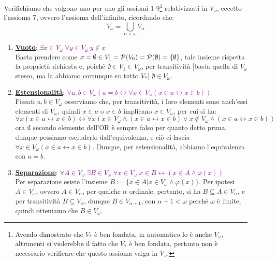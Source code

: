 \begin{soln}
	Verifichiamo che valgono uno per uno gli assiomi 1-9\footnote{Avendo dimostrato che $V_*$ è ben fondata, in automatico lo è anche $V_\omega$, altrimenti si violerebbe il fatto che $V_*$ è ben fondata, pertanto non è necessario verificare che questo assioma valga in $V_\omega$.} relativizzati in $V_\omega$, eccetto l'assioma 7, ovvero l'assioma dell'infinito, ricordando che:
	\[ V_\omega = \bigcup_{\alpha < \omega} V_\alpha
		\]
	\begin{enumerate}[(1)]
		\item \textbf{\underline{Vuoto}}: \textcolor{purple}{$\exists x \in V_\omega \; \forall y \in V_\omega \; y \not \in x$} \\
		Basta prendere come $x = \emptyset \in V_1 = \mathcal{P}(V_0) = \mathcal{P}(\emptyset) = \{\emptyset\}$, tale insieme rispetta la proprietà richiesta e, poiché $\emptyset \in V_1 \in V_\omega$, per transitività [basta quella di $V_\omega$ stesso, ma la abbiamo comunque su tutto $V_*$] $\emptyset \in V_\omega$.
		\item \textbf{\underline{Estensionalità}}: \textcolor{purple}{$\forall a,b \in V_\omega (a = b \leftrightarrow \forall x \in V_\omega (x \in a \leftrightarrow x \in b))$} \\
		Fissati $a,b \in V_\omega$ osserviamo che, per transitività, i loro elementi sono anch'essi elementi di $V_\omega$, quindi $x \in a$ o $x \in b$ implicano $x \in V_\omega$, per cui si ha:
		\[ \forall x (x \in a \leftrightarrow x \in b) \leftrightarrow \forall x (x \in V_\omega \land (x \in a \leftrightarrow x \in b) \lor x \not \in V_\omega \land (x \in a \leftrightarrow x \in b))
			\] 
		ora il secondo elemento dell'OR è sempre falso per quanto detto prima, dunque possiamo escluderlo dall'equivalenza, e ciò ci lascia $\forall x \in V_\omega (x \in a \leftrightarrow x \in b)$.
		Dunque, per estensionalità, abbiamo l'equivalenza con $a = b$.
		\item \textbf{\underline{Separazione}}: \textcolor{purple}{$\forall A \in V_\omega \; \exists B \in V_\omega \; \forall x \in V_\omega \; x \in B \leftrightarrow (x \in A \land \varphi(x))$} \\
		Per separazione esiste l'insieme $B :=\{x \in A | x \in V_\omega \land \varphi(x)\}$. Per ipotesi $A \in V_\omega$, ovvero $A \in V_{\alpha}$, per qualche $\alpha$ ordinale, pertanto, si ha $B \subseteq A \in V_\alpha$, e per transitività $B \subseteq V_\alpha$, dunque $B \in V_{\alpha + 1}$, con $\alpha + 1 < \omega$ perché $\omega$ è limite, quindi otteniamo che $B \in V_\omega$.

\end{enumerate}
\end{soln}
